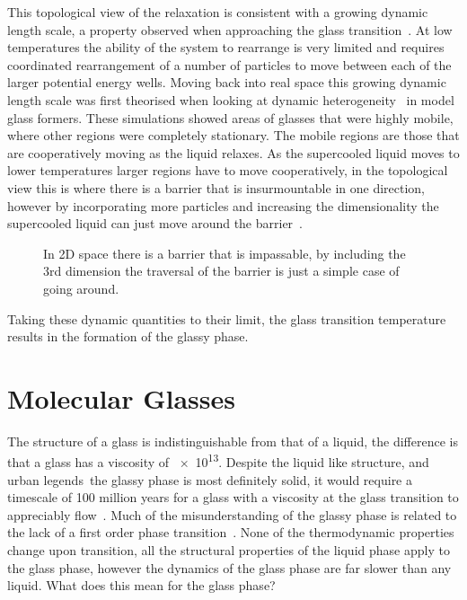 \begin{figure}
    \centering
    \caption{}
    \label{fig:pe landscape}
\end{figure}

This topological view of the relaxation is consistent with a growing dynamic length scale, a property observed when approaching the glass transition~\cite{berthier:05}. At low temperatures the ability of the system to rearrange is very limited and requires coordinated rearrangement of a number of particles to move between each of the larger potential energy wells. Moving back into real space this growing dynamic length scale was first theorised when looking at dynamic heterogeneity~\cite{hurley:95} in model glass formers. These simulations showed areas of glasses that were highly mobile, where other regions were completely stationary. The mobile regions are those that are cooperatively moving as the liquid relaxes. As the supercooled liquid moves to lower temperatures larger regions have to move cooperatively, in the topological view this is where there is a barrier that is insurmountable in one direction, however by incorporating more particles and increasing the dimensionality the supercooled liquid can just move around the barrier~.

\begin{figure}
    \centering
    \caption{In 2D space there is a barrier that is impassable, by including the 3rd dimension the traversal of the barrier is just a simple case of going around.}
    \label{fig:barrier dimensions}
\end{figure}

Taking these dynamic quantities to their limit, the glass transition temperature results in the formation of the glassy phase.


\section{Molecular Glasses}
\label{sec:molecular glasses}

The structure of a glass is indistinguishable from that of a liquid, the difference is that a glass has a viscosity of \SI{e13}{\poise}. Despite the liquid like structure, and urban legends~\tocite the glassy phase is most definitely solid, it would require a timescale of 100 million years for a glass with a viscosity at the glass transition to appreciably flow~\tocite. Much of the misunderstanding of the glassy phase is related to the lack of a first order phase transition~\tocite. None of the thermodynamic properties change upon transition, all the structural properties of the liquid phase apply to the glass phase, however the dynamics of the glass phase are far slower than any liquid. What does this mean for the glass phase? 

